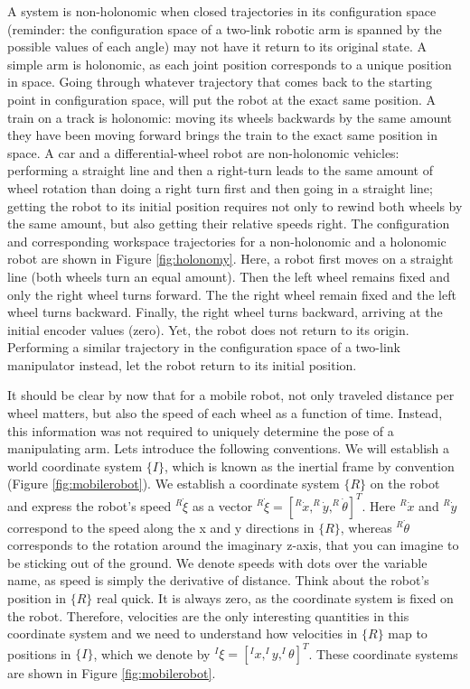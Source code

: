 A system is non-holonomic when closed trajectories in its configuration space (reminder: the configuration space of a two-link robotic arm is spanned by the possible values of each angle) may not have it return to its original state.  A simple arm is holonomic, as each joint position corresponds to a unique position in space. Going through whatever trajectory that comes back to the starting point in configuration space, will put the robot at the exact same position. A train on  a track is holonomic: moving its wheels backwards by the same amount they have been moving forward brings the train to the exact same position in space. A car and a differential-wheel robot are non-holonomic vehicles: performing a straight line and then a right-turn leads to the same amount of wheel rotation than doing a right turn first and then going in a straight line; getting the robot to its initial position requires not only to rewind both wheels by the same amount, but also getting their relative speeds right. The configuration and corresponding workspace trajectories for a non-holonomic and a holonomic robot are shown in Figure \ref{fig:holonomy}. Here, a robot first moves on a straight line (both wheels turn an equal amount). Then the left wheel remains fixed and only the right wheel turns forward. The the right wheel remain fixed and the left wheel turns backward. Finally, the right wheel turns backward, arriving at the initial encoder values (zero). Yet, the robot does not return to its origin. Performing a similar trajectory in the configuration space of a two-link manipulator instead, let the robot return to its initial position. 

It should be clear by now that for a mobile robot, not only traveled distance per wheel matters, but also the speed of each wheel as a function of time. Instead, this information was not required to uniquely determine the pose of a manipulating arm. Lets introduce the following conventions. We will establish a world coordinate system $\{I\}$, which is known as the inertial frame by convention (Figure \ref{fig:mobilerobot}). We establish a coordinate system $\{R\}$ on the robot and express the robot's speed $^R\dot{\xi}$ as a vector $ ^R\dot{\xi}=[^R\dot{x}, ^R\dot{y}, ^R\dot{\theta}]^T$. Here $^R\dot{x}$ and $^R\dot{y}$ correspond to the speed along the x and y directions in $\{R\}$, whereas $^R\dot{\theta}$ corresponds to the rotation around the imaginary z-axis, that you can imagine to be sticking out of the ground. We denote speeds with dots over the variable name, as speed is simply the derivative of distance.  Think about the robot's position in $\{R\}$ real quick. It is always zero, as the coordinate system is fixed on the robot. Therefore, velocities are the only interesting quantities in this coordinate system and we need to understand how velocities in $\{R\}$ map to positions in $ \{I\}$, which we denote by $^I\xi=[^Ix, ^Iy, ^I\theta]^T$. These coordinate systems are shown in Figure \ref{fig:mobilerobot}. 

